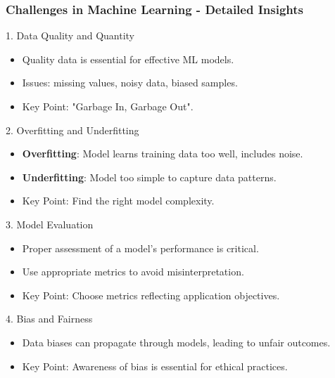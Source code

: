 \documentclass[aspectratio=169]{beamer}
\begin{document}
\begin{frame}[fragile]
    \frametitle{Challenges in Machine Learning - Detailed Insights}
    \begin{block}{1. Data Quality and Quantity}
        \begin{itemize}
            \item Quality data is essential for effective ML models.
            \item Issues: missing values, noisy data, biased samples.
            \item Key Point: "Garbage In, Garbage Out".
        \end{itemize}
    \end{block}

    \begin{block}{2. Overfitting and Underfitting}
        \begin{itemize}
            \item \textbf{Overfitting}: Model learns training data too well, includes noise.
            \item \textbf{Underfitting}: Model too simple to capture data patterns.
            \item Key Point: Find the right model complexity.
        \end{itemize}
    \end{block}
    
    \begin{block}{3. Model Evaluation}
        \begin{itemize}
            \item Proper assessment of a model's performance is critical.
            \item Use appropriate metrics to avoid misinterpretation.
            \item Key Point: Choose metrics reflecting application objectives.
        \end{itemize}
    \end{block}
    
    \begin{block}{4. Bias and Fairness}
        \begin{itemize}
            \item Data biases can propagate through models, leading to unfair outcomes.
            \item Key Point: Awareness of bias is essential for ethical practices.
        \end{itemize}
    \end{block}


\end{frame}
\end{document}
